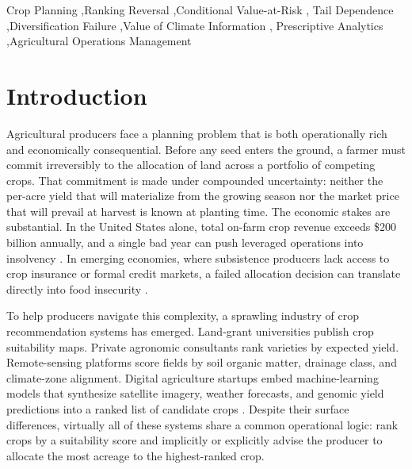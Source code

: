 \documentclass[12pt,review,authoryear]{elsarticle}
\numberwithin{equation}{section}
\begin{document}
\begin{frontmatter}
\begin{keyword}
Crop Planning \sep Ranking Reversal \sep Conditional Value-at-Risk \sep
Tail Dependence \sep Diversification Failure \sep Value of Climate Information \sep
Prescriptive Analytics \sep Agricultural Operations Management
\end{keyword}

\end{frontmatter}

\section{Introduction}
\label{sec:intro}

Agricultural producers face a planning problem that is both operationally
rich and economically consequential.  Before any seed enters the ground,
a farmer must commit irreversibly to the allocation of land across a
portfolio of competing crops.  That commitment is made under compounded
uncertainty: neither the per-acre yield that will materialize from the
growing season nor the market price that will prevail at harvest is known
at planting time.  The economic stakes are substantial.  In the United
States alone, total on-farm crop revenue exceeds \$200 billion annually,
and a single bad year can push leveraged operations into insolvency
\citep{USDA2023ERS}.  In emerging economies, where subsistence producers
lack access to crop insurance or formal credit markets, a failed
allocation decision can translate directly into food insecurity
\citep{Barnett2008}.

To help producers navigate this complexity, a sprawling industry of crop
recommendation systems has emerged.  Land-grant universities publish crop
suitability maps.  Private agronomic consultants rank varieties by
expected yield.  Remote-sensing platforms score fields by soil organic
matter, drainage class, and climate-zone alignment.  Digital agriculture
startups embed machine-learning models that synthesize satellite imagery,
weather forecasts, and genomic yield predictions into a ranked list of
candidate crops \citep{Kamilaris2018,vanKlompenburg2020}.  Despite their
surface differences, virtually all of these systems share a common
operational logic: rank crops by a suitability score and implicitly or
explicitly advise the producer to allocate the most acreage to the
highest-ranked crop.
\end{document}
